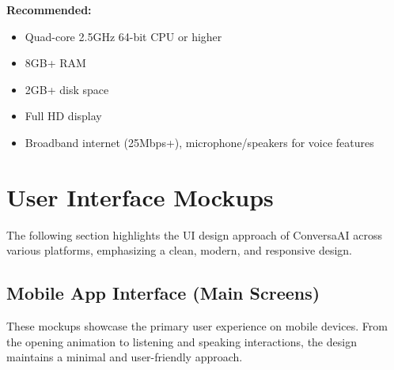 \documentclass[12pt]{article}
\begin{document}
\noindent \textbf{Recommended:}
\begin{itemize}
    \item Quad-core 2.5GHz 64-bit CPU or higher
    \item 8GB+ RAM
    \item 2GB+ disk space
    \item Full HD display
    \item Broadband internet (25Mbps+), microphone/speakers for voice features
\end{itemize}

\section*{User Interface Mockups}

The following section highlights the UI design approach of ConversaAI across various platforms, emphasizing a clean, modern, and responsive design.

\subsection*{Mobile App Interface (Main Screens)}

These mockups showcase the primary user experience on mobile devices. From the opening animation to listening and speaking interactions, the design maintains a minimal and user-friendly approach.
\end{document}

